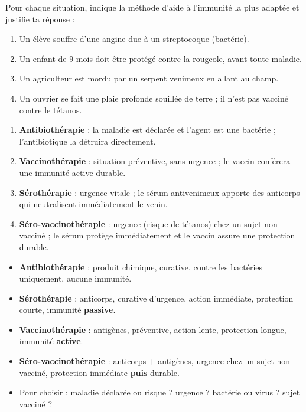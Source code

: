 \documentclass[11pt]{article}
\begin{document}
\begin{exercice}
Pour chaque situation, indique la méthode d'aide à l'immunité la plus adaptée et justifie ta réponse :
\begin{enumerate}
\item Un élève souffre d'une angine due à un streptocoque (bactérie).
\item Un enfant de 9 mois doit être protégé contre la rougeole, avant toute maladie.
\item Un agriculteur est mordu par un serpent venimeux en allant au champ.
\item Un ouvrier se fait une plaie profonde souillée de terre ; il n'est pas vacciné contre le tétanos.
\end{enumerate}
\end{exercice}

\begin{corrige}
\begin{enumerate}
\item \textbf{Antibiothérapie} : la maladie est déclarée et l'agent est une bactérie ; l'antibiotique la détruira directement.
\item \textbf{Vaccinothérapie} : situation préventive, sans urgence ; le vaccin conférera une immunité active durable.
\item \textbf{Sérothérapie} : urgence vitale ; le sérum antivenimeux apporte des anticorps qui neutralisent immédiatement le venin.
\item \textbf{Séro-vaccinothérapie} : urgence (risque de tétanos) chez un sujet non vacciné ; le sérum protège immédiatement et le vaccin assure une protection durable.
\end{enumerate}
\end{corrige}

\begin{aretenir}
\begin{itemize}
\item \textbf{Antibiothérapie} : produit chimique, curative, contre les bactéries uniquement, aucune immunité.
\item \textbf{Sérothérapie} : anticorps, curative d'urgence, action immédiate, protection courte, immunité \textbf{passive}.
\item \textbf{Vaccinothérapie} : antigènes, préventive, action lente, protection longue, immunité \textbf{active}.
\item \textbf{Séro-vaccinothérapie} : anticorps + antigènes, urgence chez un sujet non vacciné, protection immédiate \textbf{puis} durable.
\item Pour choisir : maladie déclarée ou risque ? urgence ? bactérie ou virus ? sujet vacciné ?
\end{itemize}
\end{aretenir}
\end{document}
